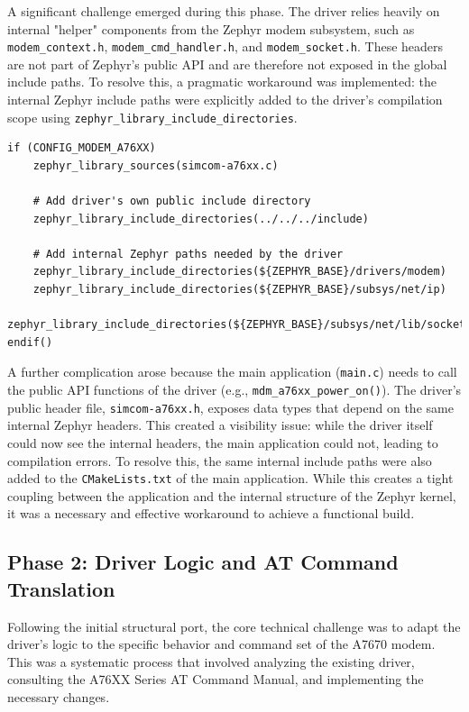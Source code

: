 A significant challenge emerged during this phase. The driver relies heavily on internal "helper" components from the Zephyr modem subsystem, such as \texttt{modem\_context.h}, \texttt{modem\_cmd\_handler.h}, and \texttt{modem\_socket.h}. These headers are not part of Zephyr's public API and are therefore not exposed in the global include paths. To resolve this, a pragmatic workaround was implemented: the internal Zephyr include paths were explicitly added to the driver's compilation scope using \texttt{zephyr\_library\_include\_directories}.

\begin{verbatim}
if (CONFIG_MODEM_A76XX)
    zephyr_library_sources(simcom-a76xx.c)
    
    # Add driver's own public include directory
    zephyr_library_include_directories(../../../include)
    
    # Add internal Zephyr paths needed by the driver
    zephyr_library_include_directories(${ZEPHYR_BASE}/drivers/modem)
    zephyr_library_include_directories(${ZEPHYR_BASE}/subsys/net/ip)
    zephyr_library_include_directories(${ZEPHYR_BASE}/subsys/net/lib/sockets)
endif()
\end{verbatim}

A further complication arose because the main application (\texttt{main.c}) needs to call the public API functions of the driver (e.g., \texttt{mdm\_a76xx\_power\_on()}). The driver's public header file, \texttt{simcom-a76xx.h}, exposes data types that depend on the same internal Zephyr headers. This created a visibility issue: while the driver itself could now see the internal headers, the main application could not, leading to compilation errors. To resolve this, the same internal include paths were also added to the \texttt{CMakeLists.txt} of the main application. While this creates a tight coupling between the application and the internal structure of the Zephyr kernel, it was a necessary and effective workaround to achieve a functional build.

\subsection{Phase 2: Driver Logic and AT Command Translation}
Following the initial structural port, the core technical challenge was to adapt the driver's logic to the specific behavior and command set of the A7670 modem. This was a systematic process that involved analyzing the existing driver, consulting the A76XX Series AT Command Manual, and implementing the necessary changes.

